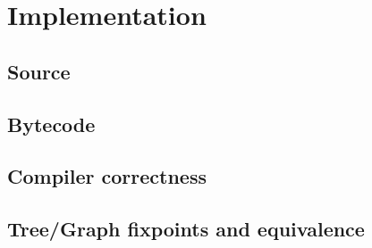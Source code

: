 \section{Implementation}

    \subsection{Source}

    \subsection{Bytecode}

    \subsection{Compiler correctness}


    \subsection{Tree/Graph fixpoints and equivalence}



